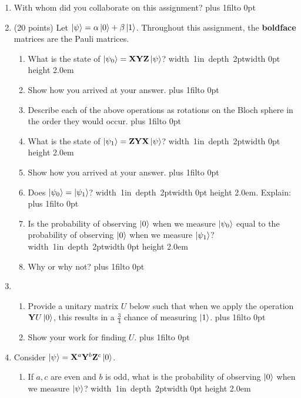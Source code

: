 \documentclass[12pt]{article}
\newcommand{\Blank}{\mbox{\hskip 4pt\vrule width 1in depth 2pt}\vrule width 0pt height 2.0em}
\def\DefaultSpace{1in}
\newcommand{\LeaveSpace}[1][\DefaultSpace]{%
\vskip #1 plus 1fil\relax\hbox to 0pt{\hss} %
}
\begin{document}
\begin{enumerate}[font=\bfseries]
\item With whom did you collaborate on this assignment?
    \LeaveSpace{}
    \item (20 points) Let $\ket{\psi} = \alpha\ket{0} + \beta\ket{1}$. Throughout this assignment, the {\bf boldface} matrices are the Pauli matrices.
    \begin{enumerate}[label=\theenumi.\arabic*]
        \item {} What is the state of $\ket{\psi_0} = \mathbf{X}\mathbf{Y}\mathbf{Z}\ket{\psi}$? \Blank{}
        \item {} Show how you arrived at your answer. \LeaveSpace[0.7in]
        \item {} Describe each of the above operations as rotations on the Bloch sphere in the order they would occur.\LeaveSpace{}
        \item {} What is the state of $\ket{\psi_1} = \mathbf{Z}\mathbf{Y}\mathbf{X}\ket{\psi}$? \Blank{}
        \item {} Show how you arrived at your answer. \LeaveSpace[0.6in]
        \item {} Does $\ket{\psi_0} = \ket{\psi_1}$? \Blank{}.  Explain:\LeaveSpace{}
        \item {} Is the probability of observing $\ket{0}$ when we measure $\ket{\psi_0}$ equal to the probability of observing $\ket{0}$ when we measure $\ket{\psi_1}$?\Blank{}
        \item {} Why or why not? \LeaveSpace{}
    \end{enumerate}
    \item {}
    \begin{enumerate}[label=\theenumi.\arabic*]
    \item {} Provide a unitary matrix $U$ below such that when we apply the operation $\mathbf{Y}U\ket{0}$, this results in a $\frac{3}{4}$ chance of measuring $\ket{1}$. \LeaveSpace{}
    \item {} Show your work for finding $U$. \LeaveSpace[2.0in]
    \end{enumerate}
    \item {} Consider $\ket{\psi} = \mathbf{X}^a\mathbf{Y}^b\mathbf{Z}^c\ket{0}$.
    \begin{enumerate}[label=\theenumi.\arabic*]
        \item {} If $a,c$ are even and $b$ is odd, what is the probability of observing $\ket{0}$ when we measure $\ket{\psi}$? \Blank{}

\end{enumerate}
\end{enumerate}
\end{document}
